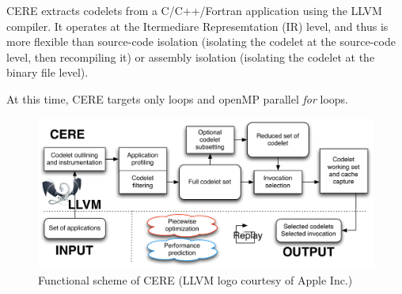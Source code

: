 \documentclass{article}
\begin{document}
\begin{multicols}{2}
CERE extracts codelets from a C/C++/Fortran application using the LLVM compiler. It operates at the Itermediare Represemtation (IR) level, and thus is more flexible than source-code isolation (isolating the codelet at the source-code level, then recompiling it) or assembly isolation (isolating the codelet at the binary file level)\cite{CERE}. 

At this time, CERE targets only loops and openMP parallel \textit{for} loops.


\end{multicols}
\begin{figure}[ht]
\begin{center}
\includegraphics[width=0.85\linewidth]{cere_fonction.pdf}
\caption{\label{CERE_schema}Functional scheme of CERE (LLVM logo courtesy of Apple Inc.)}
\end{center}
\end{figure}

\newpage
\end{document}
